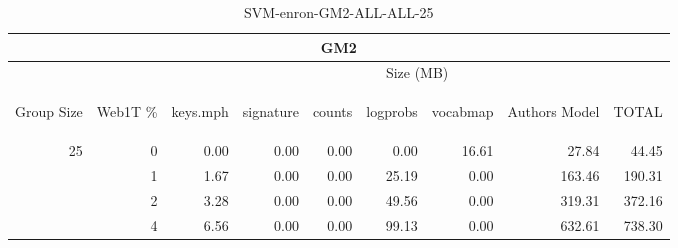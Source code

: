 \begin{center}
\begin{table}[htbp] 
 \begin{center}
\begin{tabular}{ | r | r | r | r | r | r | r | r | r |}
\hline
\multicolumn{9}{|c|}{GM2}\\
\hline
 & & \multicolumn{7}{|c|}{Size (MB)}\\ \cline{3-9}
\begin{sideways}Group Size\end{sideways} & \begin{sideways}Web1T \% \end{sideways} & \begin{sideways}keys.mph\end{sideways} & \begin{sideways}signature\end{sideways} & \begin{sideways}counts\end{sideways} & \begin{sideways}logprobs\end{sideways} & \begin{sideways}vocabmap\end{sideways} & \begin{sideways}Authors Model \end{sideways} & \begin{sideways}TOTAL\end{sideways}\\
\hline
\multirow{3}{*}{25}
 & 0 & 0.00 & 0.00 & 0.00 & 0.00 & 16.61 & 27.84 & 44.45\\ \cline{2-9}
 & 1 & 1.67 & 0.00 & 0.00 & 25.19 & 0.00 & 163.46 & 190.31\\ \cline{2-9}
 & 2 & 3.28 & 0.00 & 0.00 & 49.56 & 0.00 & 319.31 & 372.16\\ \cline{2-9}
 & 4 & 6.56 & 0.00 & 0.00 & 99.13 & 0.00 & 632.61 & 738.30\\ \cline{2-9}
\hline
\end{tabular}
\caption{SVM-enron-GM2-ALL-ALL-25}
\label{table:SVM-enron-GM2-ALL-ALL-25}
\end{center}
 \end{table}
\end{center}

